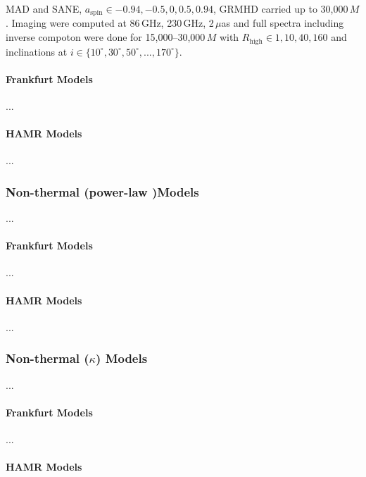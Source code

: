\documentclass[twocolumn,twocolappendix,tighten,dvipsnames,linenumbers]{aastex63}
\begin{document}
MAD and SANE, $a_\mathrm{spin} \in {-0.94, -0.5, 0, 0.5, 0.94}$, GRMHD
carried up to 30,000\,$M$.
Imaging were computed at 86\,GHz, 230\,GHz, 2\,$\mu$as and full
spectra including inverse compoton were done for 15,000--30,000\,$M$
with $R_\mathrm{high} \in {1, 10, 40, 160}$ and inclinations at $i \in
\{10^\circ, 30^\circ, 50^\circ, ..., 170^\circ\}$.

\paragraph{Frankfurt Models}

...

\paragraph{HAMR Models}

...

\subsubsection{Non-thermal (power-law )Models}

...

\paragraph{Frankfurt Models}

...

\paragraph{HAMR Models}

...

\subsubsection{Non-thermal ($\kappa$) Models}

...

\paragraph{Frankfurt Models}

...

\paragraph{HAMR Models}
\end{document}
